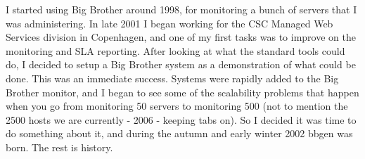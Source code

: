  I started using Big Brother around 1998, for monitoring a bunch of
 servers that I was administering. In late 2001 I began working for
 the CSC Managed Web Services division in Copenhagen, and one of my
 first tasks was to improve on the monitoring and SLA reporting. After
 looking at what the standard tools could do, I decided to setup a Big
 Brother system as a demonstration of what could be done. This was an
 immediate success. Systems were rapidly added to the Big Brother
 monitor, and I began to see some of the scalability problems that
 happen when you go from monitoring 50 servers to monitoring 500 (not
 to mention the 2500 hosts we are currently - 2006 - keeping tabs
 on). So I decided it was time to do something about it, and during
 the autumn and early winter 2002 bbgen was born. The rest is history.




